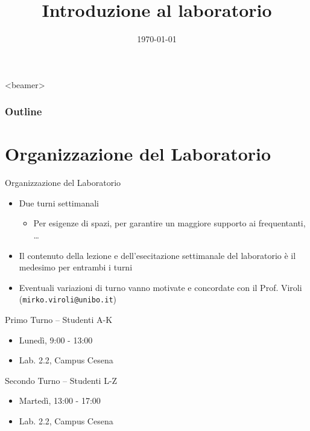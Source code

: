 \documentclass[presentation]{beamer}
\title[\lab -- Introduzione]{Introduzione al laboratorio}
\date[\today]{\today}
\begin{document}
\frame[label=coverpage]{\titlepage}

\begin{frame}<beamer>
	\frametitle{Outline}
	\tableofcontents[]
\end{frame}

\section{Organizzazione del Laboratorio}

\begin{frame}{Organizzazione del Laboratorio}

\begin{itemize}
\item Due turni settimanali
\begin{itemize}
\item Per esigenze di spazi, per garantire un maggiore supporto ai frequentanti, \dots
\end{itemize}
\item Il contenuto della lezione e dell'esecitazione settimanale del laboratorio è il medesimo per entrambi i turni
\item Eventuali variazioni di turno vanno motivate e concordate con il Prof. Viroli (\texttt{mirko.viroli@unibo.it})
\end{itemize}

\begin{block}{Primo Turno -- Studenti A-K}
\begin{itemize}
\item Lunedì, 9:00 - 13:00
\item Lab. 2.2, Campus Cesena
\end{itemize}
\end{block}

\begin{block}{Secondo Turno -- Studenti L-Z}
\begin{itemize}
\item Martedì, 13:00 - 17:00
\item Lab. 2.2, Campus Cesena
\end{itemize}
\end{block}

\end{frame}
\end{document}
